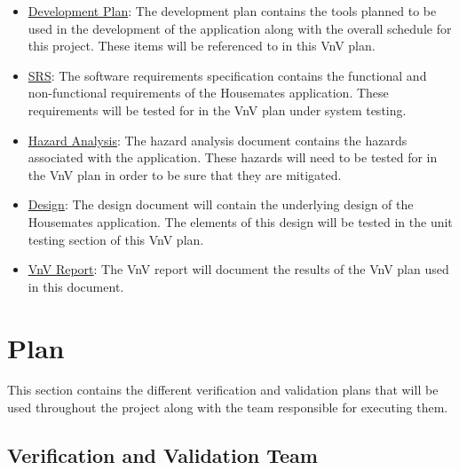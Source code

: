 \documentclass[12pt, titlepage]{article}
\begin{document}
\begin{itemize}
    \item \href{https://github.com/DangJustin/CapstoneProject/blob/main/docs/DevelopmentPlan/DevelopmentPlan.pdf}{Development Plan}: The development plan contains the tools planned to be used in the development of the application along with the overall schedule for this project. These items will be referenced to in this VnV plan.  
    \item \href{https://github.com/DangJustin/CapstoneProject/blob/main/docs/SRS-Volere/SRS.pdf}{SRS}: The software requirements specification contains the functional and non-functional requirements of the Housemates application. These requirements will be tested for in the VnV plan under system testing. 
    \item \href{https://github.com/DangJustin/CapstoneProject/blob/main/docs/HazardAnalysis/HazardAnalysis.pdf}{Hazard Analysis}: The hazard analysis document contains the hazards associated with the application. These hazards will need to be tested for in the VnV plan in order to be sure that they are mitigated.
    \item \href{https://github.com/DangJustin/CapstoneProject/tree/main/docs/Design}{Design}: The design document will contain the underlying design of the Housemates application. The elements of this design will be tested in the unit testing section of this VnV plan.
    \item \href{https://github.com/DangJustin/CapstoneProject/blob/main/docs/VnVReport/VnVReport.pdf}{VnV Report}: The VnV report will document the results of the VnV plan used in this document.
\end{itemize}




\section{Plan}

This section contains the different verification and validation plans that will be used throughout the project along with the team responsible for executing them.  


\subsection{Verification and Validation Team}
\end{document}
